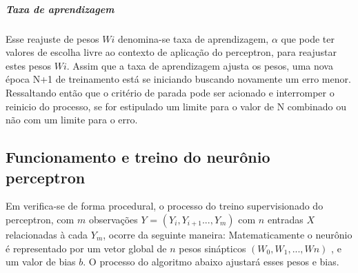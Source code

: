 \documentclass[	12pt, Times, openright, twoside, a4paper, english, brazil]{abntex2}
\begin{document}
            \subparagraph* {Taxa de aprendizagem}
            	Esse reajuste de pesos $Wi$ denomina-se taxa de aprendizagem, $\alpha$ que pode ter valores de escolha livre ao contexto de aplicação do perceptron, para reajustar estes pesos $Wi$. Assim que a taxa de aprendizagem ajusta os pesos, uma nova época N+1 de treinamento está se iniciando buscando novamente um erro menor. Ressaltando então que o critério de parada pode ser acionado e interromper o reinicio do processo, se for estipulado um limite para o valor de N combinado ou não com um limite para o erro. 
            	
          \subsection {Funcionamento e treino do neurônio perceptron}
            Em \cite{Almeida2013} verifica-se de forma procedural, o processo do treino supervisionado do perceptron, com $m$ observações $Y$ = $(Y_{i},Y_{i+1}...,Y_{m})$ com $n$ entradas $X$ relacionadas à cada $Y_m$, ocorre da seguinte maneira: 
            Matematicamente o neurônio é representado por um vetor global de $n$ pesos sinápticos $(W_0, W_{1}, ..., W{n})$ , e um valor de bias $b$. O processo do algoritmo abaixo ajustará esses pesos e bias.
\end{document}
